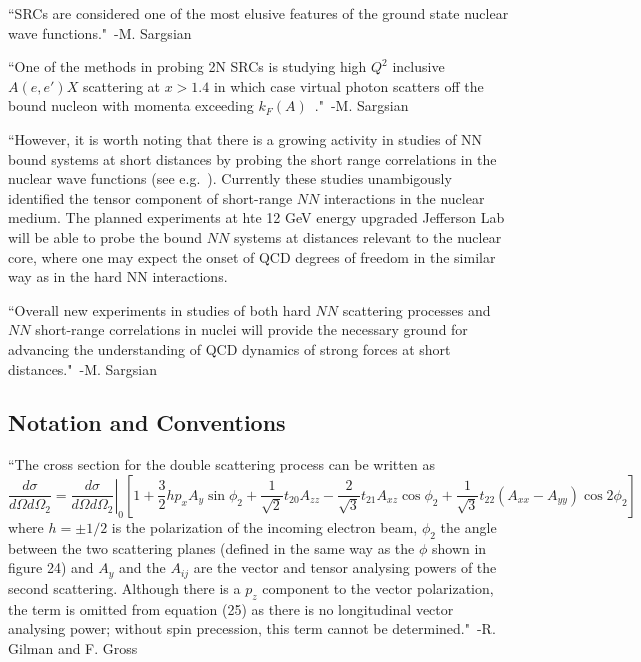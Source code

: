 ``SRCs are considered one of the most elusive features of the ground state nuclear wave functions."~-M. Sargsian~\cite{Sargsian:2012gj}

``One of the methods in probing 2N SRCs is studying high $Q^2$ inclusive $A(e,e')X$ scattering at $x>1.4$ in which case virtual photon scatters off the bound nucleon with momenta exceeding $k_F(A)$~\cite{Sargsian:2001ax, Sargsian:2002wc}."~-M. Sargsian~\cite{Sargsian:2012gj}

``However, it is worth noting that there is a growing activity in studies of NN bound systems at short distances by probing the short range correlations in the nuclear wave functions (see e.g.~\cite{Frankfurt:2008zv,Frankfurt:1993sp,Arrington:2011xs,Sargsian:2009hf,Boeglin:2011mt}). Currently these studies unambigously identified the tensor component of short-range $NN$ interactions in the nuclear medium. The planned experiments at hte 12 GeV energy upgraded Jefferson Lab \cite{Sargsian:2002wc,thomas2000science} will be able to probe the bound $NN$ systems at distances relevant to the nuclear core, where one may expect the onset of QCD degrees of freedom in the similar way as in the hard NN interactions.

``Overall new experiments in studies of both hard $NN$ scattering processes and $NN$ short-range correlations in nuclei will provide the necessary ground for advancing the understanding of QCD dynamics of strong forces at short distances."~-M. Sargsian~\cite{Sargsian:2014bwa}


\subsection{Notation and Conventions}
``The cross section for the double scattering process can be written as~\cite{Arnold:1979cg}
\begin{dmath}
	\frac{d\sigma}{d\Omega d\Omega_2} = \left. \frac{d\sigma}{d\Omega d\Omega_2}\right|_0 \left[1 + \frac{3}{2}hp_xA_y\sin{\phi_2} + \frac{1}{\sqrt{2}}t_{20}A_{zz} - \frac{2}{\sqrt{3}}t_{21}A_{xz}\cos{\phi_2}+\frac{1}{\sqrt{3}}t_{22}\left( A_{xx} - A_{yy} \right) \cos{2\phi_2}  \right]
\end{dmath}
where $h=\pm 1/2$ is the polarization of the incoming electron beam, $\phi_2$ the angle between the two scattering planes (defined in the same way as the $\phi$ shown in figure 24) and $A_y$ and the $A_{ij}$ are the vector and tensor analysing powers of the second scattering. Although there is a $p_z$ component to the vector polarization, the term is omitted from equation (25) as there is no longitudinal vector analysing power; without spin precession, this term cannot be determined."~-R. Gilman and F. Gross~\cite{Gilman:2001yh}

